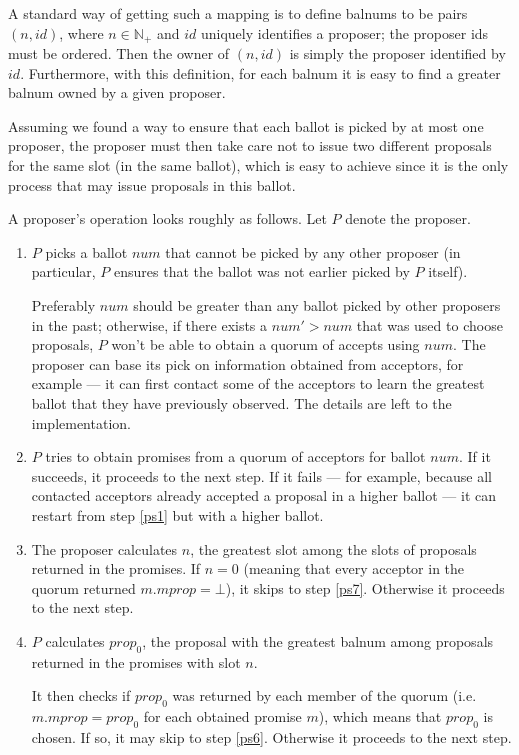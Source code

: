 \documentclass[12pt,a4paper,en]{pracamgr}
\newcommand{\mbb}[1]{\mathbb{#1}}
\begin{document}
A standard way of getting such a mapping is to define balnums to be pairs $(n, id)$, where $n \in \mbb N_+$ and $id$ uniquely identifies a proposer; the proposer ids must be ordered. Then the owner of $(n, id)$ is simply the proposer identified by $id$. Furthermore, with this definition, for each balnum it is easy to find a greater balnum owned by a given proposer.

Assuming we found a way to ensure that each ballot is picked by at most one proposer, the proposer must then take care not to issue two different proposals for the same slot (in the same ballot), which is easy to achieve since it is the only process that may issue proposals in this ballot.

A proposer's operation looks roughly as follows. Let $P$ denote the proposer.
\begin{enumerate}
    \item \label{ps1} $P$ picks a ballot $num$ that cannot be picked by any other proposer (in particular, $P$ ensures that the ballot was not earlier picked by $P$ itself).

        Preferably $num$ should be greater than any ballot picked by other proposers in the past; otherwise, if there exists a $num' > num$ that was used to choose proposals, $P$ won't be able to obtain a quorum of accepts using $num$. The proposer can base its pick on information obtained from acceptors, for example --- it can first contact some of the acceptors to learn the greatest ballot that they have previously observed. The details are left to the implementation.
    \item \label{ps2} $P$ tries to obtain promises from a quorum of acceptors for ballot $num$. If it succeeds, it proceeds to the next step. If it fails --- for example, because all contacted acceptors already accepted a proposal in a higher ballot --- it can restart from step \ref{ps1} but with a higher ballot.
    \item \label{ps3} The proposer calculates $n$, the greatest slot among the slots of proposals returned in the promises. If $n = 0$ (meaning that every acceptor in the quorum returned $m.mprop = \bot$), it skips to step \ref{ps7}. Otherwise it proceeds to the next step.
    \item \label{ps4} $P$ calculates $prop_0$, the proposal with the greatest balnum among proposals returned in the promises with slot $n$.

        It then checks if $prop_0$ was returned by each member of the quorum (i.e. $m.mprop = prop_0$ for each obtained promise $m$), which means that $prop_0$ is chosen. If so, it may skip to step \ref{ps6}. Otherwise it proceeds to the next step.


\end{enumerate}
\end{document}
